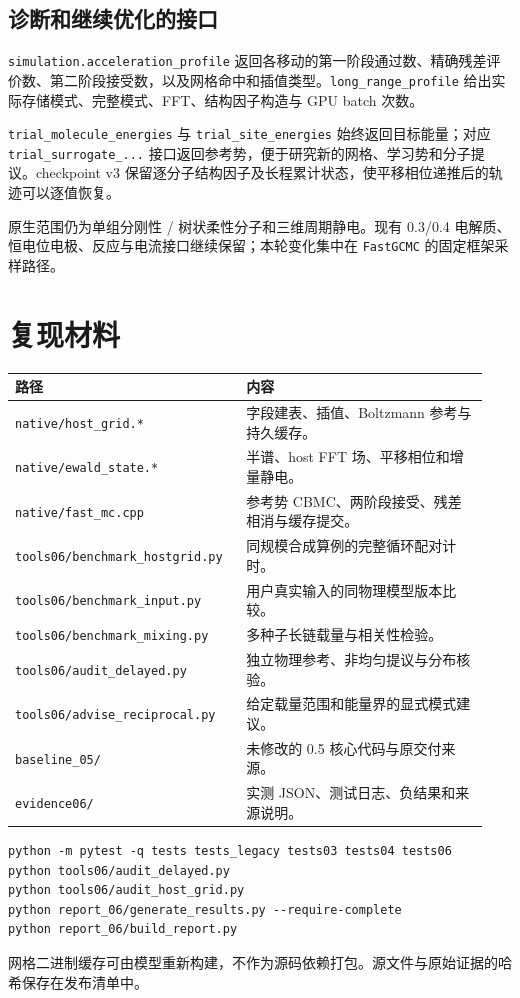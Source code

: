 \documentclass[11pt,a4paper]{article}
\newcommand{\code}[1]{\texttt{\small #1}}
\begin{document}
\subsection{诊断和继续优化的接口}
\code{simulation.acceleration\_profile} 返回各移动的第一阶段通过数、精确残差评价数、第二阶段接受数，以及网格命中和插值类型。\code{long\_range\_profile} 给出实际存储模式、完整模式、FFT、结构因子构造与 GPU batch 次数。

\code{trial\_molecule\_energies} 与 \code{trial\_site\_energies} 始终返回目标能量；对应 \code{trial\_surrogate\_...} 接口返回参考势，便于研究新的网格、学习势和分子提议。checkpoint v3 保留逐分子结构因子及长程累计状态，使平移相位递推后的轨迹可以逐值恢复。

原生范围仍为单组分刚性 / 树状柔性分子和三维周期静电。现有 0.3/0.4 电解质、恒电位电极、反应与电流接口继续保留；本轮变化集中在 \code{FastGCMC} 的固定框架采样路径。

\section{复现材料}
\begingroup\small
\begin{longtable}{@{}p{0.45\linewidth}p{0.49\linewidth}@{}}\toprule
路径 & 内容\\\midrule
\code{native/host\_grid.*} & 字段建表、插值、Boltzmann 参考与持久缓存。\\
\code{native/ewald\_state.*} & 半谱、host FFT 场、平移相位和增量静电。\\
\code{native/fast\_mc.cpp} & 参考势 CBMC、两阶段接受、残差相消与缓存提交。\\
\code{tools06/benchmark\_hostgrid.py} & 同规模合成算例的完整循环配对计时。\\
\code{tools06/benchmark\_input.py} & 用户真实输入的同物理模型版本比较。\\
\code{tools06/benchmark\_mixing.py} & 多种子长链载量与相关性检验。\\
\code{tools06/audit\_delayed.py} & 独立物理参考、非均匀提议与分布核验。\\
\code{tools06/advise\_reciprocal.py} & 给定载量范围和能量界的显式模式建议。\\
\code{baseline\_05/} & 未修改的 0.5 核心代码与原交付来源。\\
\code{evidence06/} & 实测 JSON、测试日志、负结果和来源说明。\\\bottomrule
\end{longtable}
\endgroup
\begin{lstlisting}
python -m pytest -q tests tests_legacy tests03 tests04 tests06
python tools06/audit_delayed.py
python tools06/audit_host_grid.py
python report_06/generate_results.py --require-complete
python report_06/build_report.py
\end{lstlisting}
网格二进制缓存可由模型重新构建，不作为源码依赖打包。源文件与原始证据的哈希保存在发布清单中。
\end{document}
